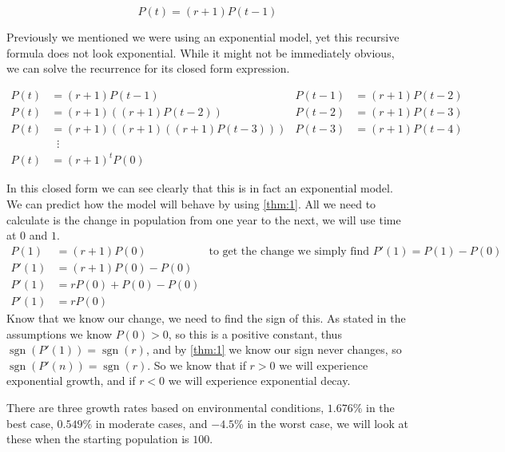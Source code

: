 \documentclass{article}
\DeclareMathOperator{\sgn}{sgn}
\begin{document}
\begin{equation} \label{eq:basic-recursive-exponential}
    P(t) = (r+1)P(t-1)
\end{equation}

Previously we mentioned we were using an exponential model, yet this recursive formula does not look exponential. While it might not be immediately obvious, we can solve the recurrence for its closed form expression.

\begin{align}\label{eq:basic-closed}
    P(t) &= (r+1)P(t-1) & P(t-1) &= (r+1)P(t-2) \nonumber \\
    P(t) &= (r+1)\left((r+1)P(t-2)\right) & P(t-2) &= (r+1)P(t-3) \nonumber \\
    P(t) &= (r+1)\left((r+1)\left((r+1)P(t-3)\right)\right) & P(t-3) &= (r+1)P(t-4) \nonumber \\
    &\phantom{x}\vdots \nonumber \\
    P(t) &= (r+1)^tP(0)
\end{align}

In this closed form we can see clearly that this is in fact an exponential model. We can predict how the model will behave by using \cref{thm:1}. All we need to calculate is the change in population from one year to the next, we will use time at $0$ and $1$.
\begin{align*}
    P(1) &= (r+1)P(0) & \text{to get the change we simply find } P'(1)=P(1)-P(0)\\
    P'(1) &= (r+1)P(0)-P(0) \\
    P'(1) &= rP(0) + P(0) - P(0) \\
    P'(1) &= rP(0)
\end{align*}
Know that we know our change, we need to find the sign of this. As stated in the assumptions we know $P(0)>0$, so this is a positive constant, thus $\sgn(P'(1)) = \sgn(r)$, and by \cref{thm:1} we know our sign never changes, so $\sgn(P'(n))=\sgn(r)$. So we know that if $r > 0$ we will experience exponential growth, and if $r < 0$ we will experience exponential decay.


There are three growth rates based on environmental conditions, $1.676\%$ in the best case, $0.549\%$ in moderate cases, and $-4.5\%$ in the worst case, we will look at these when the starting population is $100$.
\end{document}
